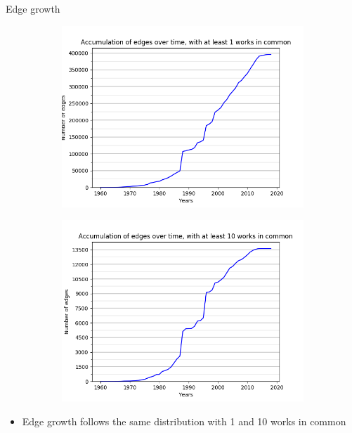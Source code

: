 \begin{frame}{Edge growth}
\begin{figure}
	\centering
	\begin{subfigure}{.5\columnwidth}
		\centering
		\includegraphics[scale=0.35]{graphics/accumulationEdges_1_1960-2018.png}
	\end{subfigure}%
	\begin{subfigure}{.5\columnwidth}
		\centering
		\includegraphics[scale=0.35]{graphics/accumulationEdges_10_1960-2018.png}
	\end{subfigure}
\end{figure}
\begin{itemize}
\item Edge growth follows the same distribution with 1 and 10 works in common
\end{itemize}
\end{frame}

